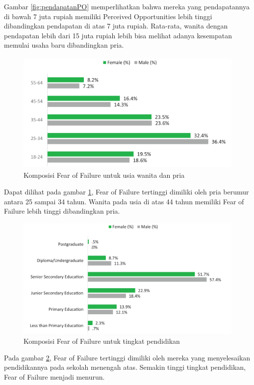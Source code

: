 Gambar \ref{fig:pendapatanPO} memperlihatkan bahwa mereka yang pendapatannya di bawah 7 juta rupiah memiliki Perceived Opportunities lebih tinggi dibandingkan pendapatan di atas 7 juta rupiah. Rata-rata, wanita dengan pendapatan lebih dari 15 juta rupiah lebih bisa melihat adanya kesempatan memulai usaha baru dibandingkan pria.

\begin{figure} [H]
	\centering  
	\includegraphics[width=13cm, height=6cm]{usiaFF2013} 
	\caption[Komposisi Fear of Failure untuk usia wanita dan pria]{Komposisi Fear of Failure untuk usia wanita dan pria} 
	\label{fig:umurFF} 
\end{figure} 

Dapat dilihat pada gambar \ref{fig:umurFF}, Fear of Failure tertinggi dimiliki oleh pria berumur antara 25 sampai 34 tahun. Wanita pada usia di atas 44 tahun memiliki Fear of Failure lebih tinggi dibandingkan pria.

\begin{figure} [H]
	\centering  
	\includegraphics[width=13cm, height=6cm]{pendidikanFF2013} 
	\caption[Komposisi Fear of Failure untuk tingkat pendidikan]{Komposisi Fear of Failure untuk tingkat pendidikan} 
	\label{fig:pendidikanFF} 
\end{figure} 

Pada gambar \ref{fig:pendidikanFF}, Fear of Failure tertinggi dimiliki oleh mereka yang menyelesaikan pendidikannya pada sekolah menengah atas. Semakin tinggi tingkat pendidikan, Fear of Failure menjadi menurun.

